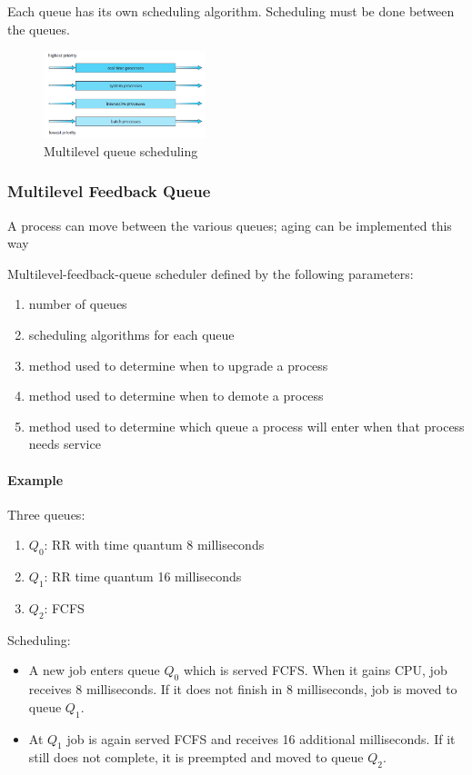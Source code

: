 Each queue has its own scheduling algorithm. Scheduling must be done between the queues. 

\begin{figure}[!htb]
    \centering
    \includegraphics[width=0.42\textwidth]{pic/OS5/Multilevel queue scheduling}
    \caption{Multilevel queue scheduling}
\end{figure}


\subsubsection{Multilevel Feedback Queue}
A process can move between the various queues; aging can be implemented this way

Multilevel-feedback-queue scheduler defined by the following parameters:
\begin{enumerate}\small
    \item number of queues
    \item scheduling algorithms for each queue
    \item method used to determine when to upgrade a process
    \item method used to determine when to demote a process
    \item method used to determine which queue a process will enter when that process needs service    
\end{enumerate}

\paragraph{Example}Three queues:
\begin{enumerate}
    \item $Q_0$: RR with time quantum 8 milliseconds
    \item $Q_1$: RR time quantum 16 milliseconds
    \item $Q_2$: FCFS
\end{enumerate}

Scheduling:
\begin{itemize}\small
    \item A new job enters queue $Q_0$ which is served FCFS. When it
    gains CPU, job receives 8 milliseconds. If it does not finish in 8
    milliseconds, job is moved to queue $Q_1$.
    \item At $Q_1$ job is again served FCFS and receives 16 additional
    milliseconds. If it still does not complete, it is preempted and
    moved to queue $Q_2$.    
\end{itemize}

